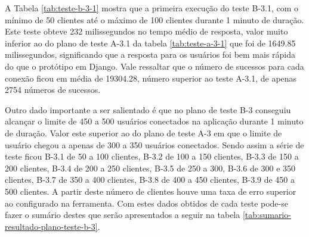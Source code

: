   A Tabela \ref{tab:teste-b-3-1} mostra que a primeira execução do teste B-3.1, com o mínimo de 50 clientes até o máximo de 100 clientes
  durante 1 minuto de duração. Este teste obteve 232 milissegundos no tempo médio de resposta, valor muito inferior ao do plano de
  teste A-3.1 da tabela \ref{tab:teste-a-3-1} que foi de 1649.85 milissegundos, significando que a resposta para os usuários
  foi bem mais rápida do que o protótipo em Django. Vale ressaltar que o número de sucessos para cada conexão ficou em média de
  19304.28, número superior ao teste A-3.1, de apenas 2754 números de sucessos.

  Outro dado importante a ser salientado é que no plano de teste B-3 conseguiu alcançar o limite de 450 a 500 usuários conectados
  na aplicação durante 1 minuto de duração. Valor este superior ao do plano de teste A-3 em que o limite de usuário chegou a apenas
  de 300 a 350 usuários conectados. Sendo assim a série de teste ficou B-3.1 de 50 a 100 clientes, B-3.2 de 100 a 150 clientes,
  B-3.3 de 150 a 200 clientes, B-3.4 de 200 a 250 clientes, B-3.5 de 250 a 300, B-3.6 de 300 e 350 clientes, B-3.7 de 350 a 400 clientes,
  B-3.8 de 400 a 450 clientes, B-3.9 de 450 a 500 clientes. A partir deste número de clientes houve uma taxa de erro superior ao
  configurado na ferramenta. Com estes dados obtidos de cada teste pode-se fazer o sumário
  destes que serão apresentados a seguir na tabela \ref{tab:sumario-resultado-plano-teste-b-3}.

